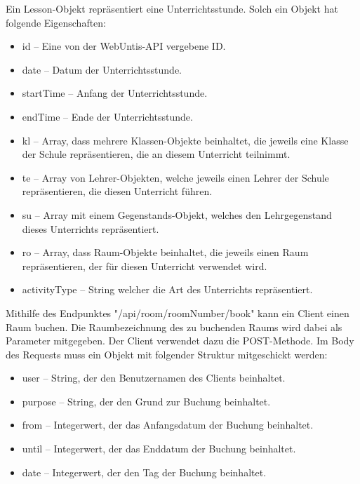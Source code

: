 
Ein Lesson-Objekt repräsentiert eine Unterrichtsstunde. Solch ein Objekt hat folgende Eigenschaften: 

\begin{itemize}
    \item id -- Eine von der WebUntis-API vergebene ID.
    \item date -- Datum der Unterrichtsstunde.
    \item startTime -- Anfang der Unterrichtsstunde.
    \item endTime -- Ende der Unterrichtsstunde.
    \item kl -- Array, dass mehrere Klassen-Objekte beinhaltet, die jeweils eine Klasse der Schule repräsentieren, die an diesem Unterricht teilnimmt. 
    \item te -- Array von Lehrer-Objekten, welche jeweils einen Lehrer der Schule repräsentieren, die diesen Unterricht führen. 
    \item su -- Array mit einem Gegenstands-Objekt, welches den Lehrgegenstand dieses Unterrichts repräsentiert.
    \item ro -- Array, dass Raum-Objekte beinhaltet, die jeweils einen Raum repräsentieren, der für diesen Unterricht verwendet wird. 
    \item activityType -- String welcher die Art des Unterrichts repräsentiert. 
\end{itemize}


Mithilfe des Endpunktes "/api/room/{roomNumber}/book" kann ein Client einen Raum buchen. Die Raumbezeichnung des zu buchenden Raums wird dabei als Parameter mitgegeben. Der Client verwendet dazu die POST-Methode. Im Body des Requests muss ein Objekt mit folgender Struktur mitgeschickt werden: 

\begin{itemize}
    \item user -- String, der den Benutzernamen des Clients beinhaltet. 
    \item purpose -- String, der den Grund zur Buchung beinhaltet.
    \item from -- Integerwert, der das Anfangsdatum der Buchung beinhaltet.
    \item until -- Integerwert, der das Enddatum der Buchung beinhaltet.
    \item date -- Integerwert, der den Tag der Buchung beinhaltet. 
\end{itemize}

